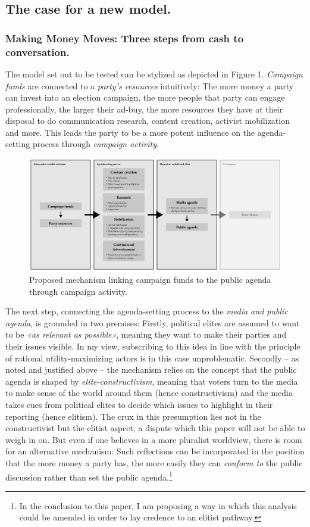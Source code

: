 \documentclass[11pt,a4paper]{article}
\begin{document}
\subsection{The case for a new model.}

\subsubsection{Making Money Moves: Three steps from cash to conversation.}
The model set out to be tested can be stylized as depicted in Figure 1. \textit{Campaign funds} are connected to a \textit{party’s resources} intuitively: The more money a party can invest into an election campaign, the more people that party can engage professionally, the larger their ad-buy, the more resources they have at their disposal to do communication research, content creation, activist mobilization and more. This leads the party to be a more potent influence on the agenda-setting process through \textit{campaign activity}. 

\begin{figure}[htbp]
    \centering
    \includegraphics[width=1\linewidth]{LaTeX/figures/Process.png}
    \caption{Proposed mechanism linking campaign funds to the public agenda through campaign activity.}
    \label{fig:enter-label}
\end{figure}
The next step, connecting the agenda-setting process to the \textit{media and public agenda}, is grounded in two premises: Firstly, political elites are assumed to want to be \textit{«as relevant as possible»}, meaning they want to make their parties and their issues visible. In my view, subscribing to this idea in line with the principle of rational utility-maximizing actors is in this case unproblematic. Secondly – as noted and justified above – the mechanism relies on the concept that the public agenda is shaped by \textit{elite-constructivism}, meaning that voters turn to the media to make sense of the world around them (hence constructivism) and the media takes cues from political elites to decide which issues to highlight in their reporting (hence elitism). The crux in this presumption lies not in the constructivist but the elitist aspect, a dispute which this paper will not be able to weigh in on. But even if one believes in a more pluralist worldview, there is room for an alternative mechanism: Such reflections can be incorporated in the position that the more money a party has, the more easily they can \textit{conform to} the public discussion rather than set the public agenda.\footnote{ In the conclusion to this paper, I am proposing a way in which this analysis could be amended in order to lay credence to an elitist pathway.}
\end{document}
